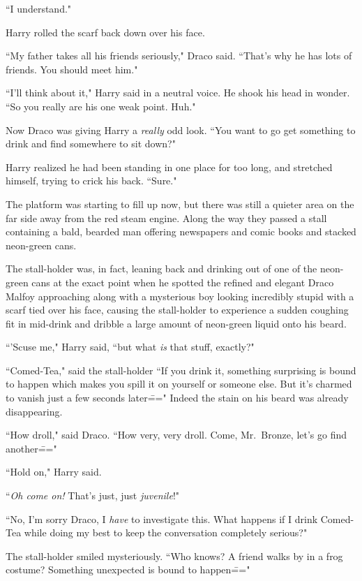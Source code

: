 ``I understand."

Harry rolled the scarf back down over his face.

``My father takes all his friends seriously," Draco said. ``That's why he has lots of friends. You should meet him."

``I'll think about it," Harry said in a neutral voice. He shook his head in wonder. ``So you really are his one weak point. Huh."

Now Draco was giving Harry a \emph{really} odd look. ``You want to go get something to drink and find somewhere to sit down?"

Harry realized he had been standing in one place for too long, and stretched himself, trying to crick his back. ``Sure."

The platform was starting to fill up now, but there was still a quieter area on the far side away from the red steam engine. Along the way they passed a stall containing a bald, bearded man offering newspapers and comic books and stacked neon-green cans.

The stall-holder was, in fact, leaning back and drinking out of one of the neon-green cans at the exact point when he spotted the refined and elegant Draco Malfoy approaching along with a mysterious boy looking incredibly stupid with a scarf tied over his face, causing the stall-holder to experience a sudden coughing fit in mid-drink and dribble a large amount of neon-green liquid onto his beard.

``'Scuse me," Harry said, ``but what \emph{is} that stuff, exactly?"

``Comed-Tea," said the stall-holder ``If you drink it, something surprising is bound to happen which makes you spill it on yourself or someone else. But it's charmed to vanish just a few seconds later\===" Indeed the stain on his beard was already disappearing.

``How droll," said Draco. ``How very, very droll. Come, Mr.~Bronze, let's go find another\==="

``Hold on," Harry said.

``\emph{Oh come on!} That's just, just \emph{juvenile}!"

``No, I'm sorry Draco, I \emph{have} to investigate this. What happens if I drink Comed-Tea while doing my best to keep the conversation completely serious?"

The stall-holder smiled mysteriously. ``Who knows? A friend walks by in a frog costume? Something unexpected is bound to happen\==="

